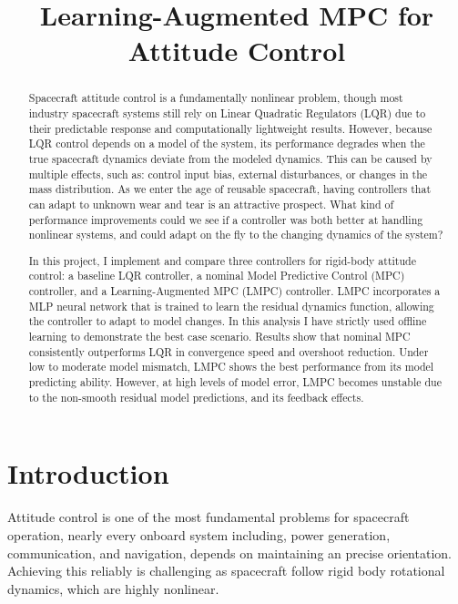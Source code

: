 \documentclass[conference]{IEEEtran}
\begin{document}
\title{Learning-Augmented MPC for Attitude Control
}

\author{
}

\maketitle

\begin{abstract}
Spacecraft attitude control is a fundamentally nonlinear problem, though most
industry spacecraft systems still rely on Linear Quadratic Regulators (LQR) due to their
predictable response and computationally lightweight results. However, because LQR
control depends on a model of the system, its performance degrades when the
true spacecraft dynamics deviate from the modeled dynamics. This can be caused by multiple 
effects, such as: control input bias, external disturbances, or changes in the mass distribution.
As we enter the age of reusable spacecraft, having controllers that can adapt to 
unknown wear and tear is an attractive prospect. What kind of performance improvements
could we see if a controller was both better at handling nonlinear systems, and 
could adapt on the fly to the changing dynamics of the system?

In this project, I implement and compare three controllers for rigid-body
attitude control: a baseline LQR controller, a nominal Model Predictive
Control (MPC) controller, and a Learning-Augmented MPC (LMPC) controller.
LMPC incorporates a MLP neural network that is trained to learn
the residual dynamics function, allowing the controller to adapt to model changes.
In this analysis I have strictly used offline learning to demonstrate the 
best case scenario. Results show that nominal MPC
consistently outperforms LQR in convergence speed and overshoot reduction.
Under low to moderate model mismatch, LMPC shows the best 
performance from its model predicting ability. However, at high levels of model error,
LMPC becomes unstable due to the non-smooth residual model predictions,
and its feedback effects. 
\end{abstract}

\section{Introduction}
Attitude control is one of the most fundamental problems for spacecraft operation, nearly
every onboard system including, power generation, communication, and
navigation, depends on maintaining an precise orientation. Achieving this reliably
is challenging as spacecraft follow rigid body rotational dynamics, which are highly
nonlinear.
\end{document}
